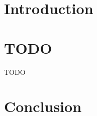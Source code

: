 \maketitle



\tableofcontents



\section*{Introduction}\label{sec:intro}





\section{TODO}\label{sec:TODO}

TODO



\section*{Conclusion}\label{sec:ccl}
 








%




